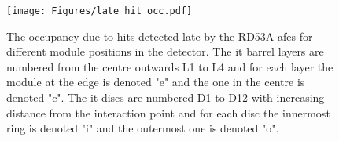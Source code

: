\begin{figure}[ht]
    \centering
    \texttt{[image: Figures/late\_hit\_occ.pdf]}
    \caption{The occupancy due to hits detected late by the RD53A \glspl{afe} for different module positions in the detector. The \gls{it} barrel layers are numbered from the centre outwards L1 to L4 and for each layer the module at the edge is denoted "e" and the one in the centre is denoted "c". The \gls{it} discs are numbered D1 to D12 with increasing distance from the interaction point and for each disc the innermost ring is denoted "i" and the outermost one is denoted "o".}
    \label{fig:late-hit-occ}
\end{figure}
